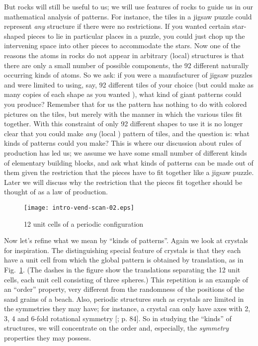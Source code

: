\documentclass[reqno]{stml-l}
\theoremstyle{plain}
\theoremstyle{definition}
\numberwithin{equation}{chapter}
\begin{document}
But rocks will still be useful to us; we will use features of rocks to guide us in our mathematical analysis of patterns. For instance, the tiles in a jigsaw puzzle could represent \emph{any} structure if there were no restrictions. If you wanted certain star-shaped pieces to lie in particular places in a puzzle, you could just chop up the intervening space into other pieces to accommodate the stars. Now one of the reasons the atoms in rocks do not appear in arbitrary (local) structures is that there are only a small number of possible components, the 92 different naturally occurring kinds of atoms. So we ask: if you were a manufacturer of jigsaw puzzles and were limited to using, say, 92 different tiles of your choice (but could make as many copies of each shape as you wanted ), what kind of giant patterns could you produce? Remember that for us the pattern has nothing to do with colored pictures on the tiles, but merely with the manner in which the various tiles fit together. With this constraint of only 92 different shapes to use it is no longer clear that you could make \emph{any} (local ) pattern of tiles, and the question is: what kinds of patterns could you make? This is where our discussion about rules of production has led us; we assume we have some small number of different kinds of elementary building blocks, and ask what kinds of patterns can be made out of them given the restriction that the pieces have to fit together like a jigsaw puzzle. Later we will discuss why the restriction that the pieces fit together should be thought of as a law of production.

\begin{figure}[!h]
\texttt{[image: intro-vend-scan-02.eps]}
\caption{12 unit cells of a periodic
configuration}\label{Intro:fig2}
\end{figure}


Now let's refine what we mean by ``kinds of patterns''. Again we look at crystals for inspiration. The distinguishing special feature of crystals is that they each have a unit cell from which the global pattern is obtained by translation, as in Fig.~\ref{Intro:fig2}. (The dashes in the figure show the translations separating the 12 unit cells, each unit cell consisting of three spheres.) This repetition is an example of an ``order'' property, very different from the randomness of the positions of the sand grains of a beach. Also, periodic structures such as crystals are limited in the symmetries they may have; for instance, a crystal can only have axes with 2, 3, 4 and 6-fold rotational symmetry [; p. 84]. So in studying the ``kinds'' of structures, we will concentrate on the order and, especially, the \emph{symmetry} properties they may possess.
\end{document}
